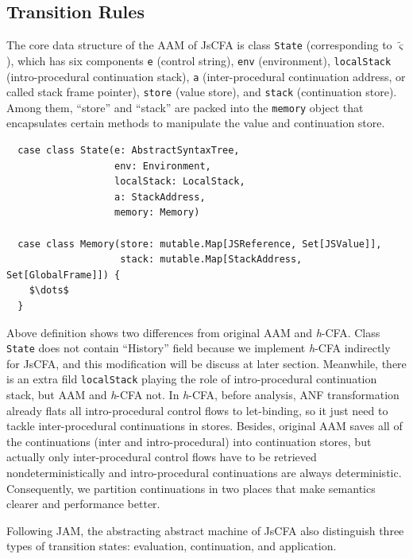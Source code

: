 \documentclass{article}
\begin{document}
\subsection{Transition Rules}
\label{sub:Transition}

The core data structure of the AAM of JsCFA is class \verb|State| (corresponding to $\tilde{\varsigma}$), which has six components \verb|e| (control string), \verb|env| (environment), \verb|localStack| (intro-procedural continuation stack), \verb|a| (inter-procedural continuation address, or called stack frame pointer), \verb|store| (value store), and \verb|stack| (continuation store). Among them, ``store'' and ``stack'' are packed into the \verb|memory| object that encapsulates certain methods to manipulate the value and continuation store.

\lstset{language=Scala, mathescape}
\begin{lstlisting}
  case class State(e: AbstractSyntaxTree,
                   env: Environment,
                   localStack: LocalStack,
                   a: StackAddress,
                   memory: Memory)

  case class Memory(store: mutable.Map[JSReference, Set[JSValue]],
                    stack: mutable.Map[StackAddress, Set[GlobalFrame]]) {
    $\dots$
  }
\end{lstlisting}

Above definition shows two differences from original AAM and \textit{h}-CFA\@. Class \verb|State| does not contain ``History'' field because we implement \textit{h}-CFA indirectly for JsCFA, and this modification will be discuss at later section.
Meanwhile, there is an extra fild \verb|localStack| playing the role of intro-procedural continuation stack, but AAM and \textit{h}-CFA not. In \textit{h}-CFA, before analysis, ANF transformation already flats all intro-procedural control flows to let-binding, so it just need to tackle inter-procedural continuations in stores. Besides, original AAM saves all of the continuations (inter and intro-procedural) into continuation stores, but actually only inter-procedural control flows have to be retrieved nondeterministically and intro-procedural continuations are always deterministic.
Consequently, we partition continuations in two places that make semantics clearer and performance better.

Following JAM, the abstracting abstract machine of JsCFA also distinguish three types of transition states: evaluation, continuation, and application.
\end{document}
